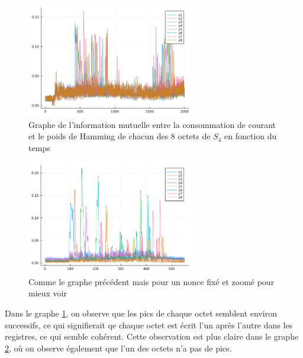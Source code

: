 \documentclass[12pt]{article}
\begin{document}
	\begin{figure}[H]
		\centering
		\includegraphics[width=0.65\textwidth]{hHW_each_byte}
		\caption{Graphe de l'information mutuelle entre la consommation de courant et le poids de Hamming de chacun des 8 octets de $S_4$ en fonction du temps}
		\label{hHW8}
	\end{figure}
	
	\begin{figure}[H]
		\centering
		\includegraphics[width = 0.65\textwidth]{hHW_8_bytes_zoom}
		\caption{Comme le graphe précédent mais pour un nonce fixé et zoomé pour mieux voir}
		\label{hHW8_zoom}
	\end{figure}
	
	Dans le graphe \ref{hHW8}, on observe que les pics de chaque octet semblent environ successifs, ce qui signifierait qe chaque octet est écrit l'un après l'autre dans les registres, ce qui semble cohérent. Cette observation est plus claire dans le graphe \ref{hHW8_zoom}, où on observe également que l'un des octets n'a pas de pics.
	
\end{document}
